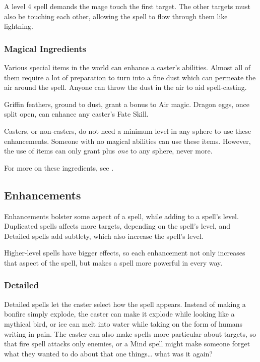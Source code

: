 \begin{multicols}{2}
A level 4 spell demands the mage touch the first target.
The other targets must also be touching each other, allowing the spell to flow through them like lightning.

\subsubsection{Magical Ingredients}

Various special items in the world can enhance a caster's abilities.
Almost all of them require a lot of preparation to turn into a fine dust which can permeate the air around the spell.
Anyone can throw the dust in the air to aid spell-casting.

Griffin feathers, ground to dust, grant a bonus to Air magic.
Dragon eggs, once split open, can enhance any caster's Fate Skill.

Casters, or non-casters, do not need a minimum level in any sphere to use these enhancements.
Someone with no magical abilities can use these items.
However, the use of items can only grant plus \emph{one} to any sphere, never more.

For more on these ingredients, see .

\subsection{Enhancements}

Enhancements bolster some aspect of a spell, while adding to a spell's level.
Duplicated spells affects more targets, depending on the spell's level, and Detailed spells add subtlety, which also increase the spell's level.

Higher-level spells have bigger effects, so each enhancement not only increases that aspect of the spell, but makes a spell more powerful in every way.

\subsubsection{Detailed}

Detailed spells let the caster select how the spell appears.
Instead of making a bonfire simply explode, the caster can make it explode while looking like a mythical bird, or ice can melt into water while taking on the form of humans writing in pain.
The caster can also make spells more particular about targets, so that fire spell attacks only enemies, or a Mind spell might make someone forget what they wanted to do about that one things\ldots{} what was it again?


\end{multicols}
